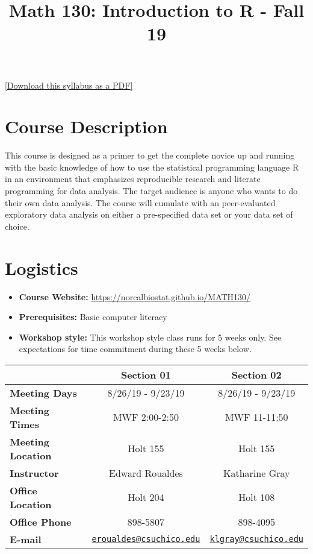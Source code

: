 \documentclass[11pt,]{article}
\title{Math 130: Introduction to R - Fall 19}
\author{}
\date{}
\providecommand{\tightlist}{%
  \setlength{\itemsep}{0pt}\setlength{\parskip}{0pt}}
\begin{document}
\maketitle

\href{syllabus.pdf}{{[}Download this syllabus as a PDF{]}}

\hypertarget{course-description}{%
\section{Course Description}\label{course-description}}

This course is designed as a primer to get the complete novice up and
running with the basic knowledge of how to use the statistical
programming language R in an environment that emphasizes reproducible
research and literate programming for data analysis. The target audience
is anyone who wants to do their own data analysis. The course will
cumulate with an peer-evaluated exploratory data analysis on either a
pre-specified data set or your data set of choice.

\hypertarget{logistics}{%
\section{Logistics}\label{logistics}}

\begin{itemize}
\tightlist
\item
  \textbf{Course Website:}
  \url{https://norcalbiostat.github.io/MATH130/}
\item
  \textbf{Prerequisites:} Basic computer literacy
\item
  \textbf{Workshop style:} This workshop style class runs for 5 weeks
  only. See expectations for time commitment during these 5 weeks below.
\end{itemize}

\begin{longtable}[]{@{}lcc@{}}
\toprule
& Section 01 & Section 02\tabularnewline
\midrule
\endhead
\textbf{Meeting Days} & 8/26/19 - 9/23/19 & 8/26/19 -
9/23/19\tabularnewline
\textbf{Meeting Times} & MWF 2:00-2:50 & MWF 11-11:50\tabularnewline
\textbf{Meeting Location} & Holt 155 & Holt 155\tabularnewline
\textbf{Instructor} & Edward Roualdes & Katharine Gray\tabularnewline
\textbf{Office Location} & Holt 204 & Holt 108\tabularnewline
\textbf{Office Phone} & 898-5807 & 898-4095\tabularnewline
\textbf{E-mail} &
\href{mailto:eroualdes@csuchico.edu}{\nolinkurl{eroualdes@csuchico.edu}}
&
\href{mailto:klgray@csuchico.edu}{\nolinkurl{klgray@csuchico.edu}}\tabularnewline
\bottomrule
\end{longtable}
\end{document}
